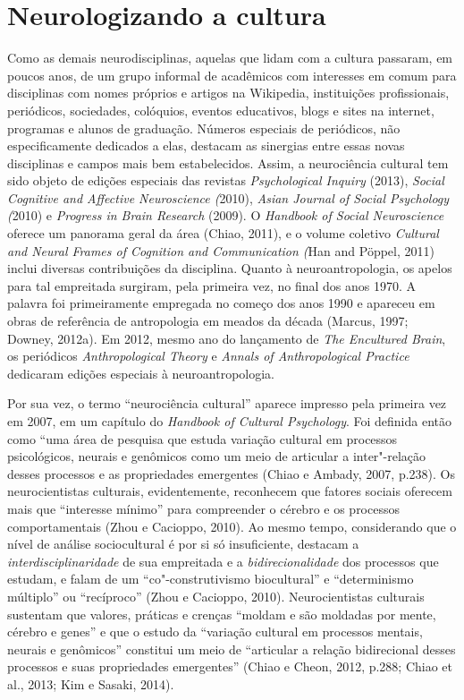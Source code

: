 \chapter{Neurologizando a cultura}

Como as demais neurodisciplinas, aquelas que lidam com a cultura
passaram, em poucos anos, de um grupo informal de acadêmicos com
interesses em comum para disciplinas com nomes próprios e artigos na
Wikipedia, instituições profissionais, periódicos, sociedades,
colóquios, eventos educativos, blogs e sites na internet, programas e
alunos de graduação. Números especiais de periódicos, não
especificamente dedicados a elas, destacam as sinergias entre essas
novas disciplinas e campos mais bem estabelecidos. Assim, a neurociência
cultural tem sido objeto de edições especiais das revistas
\emph{Psychological Inquiry} (2013), \emph{Social Cognitive and
Affective Neuroscience (}2010), \emph{Asian Journal of Social Psychology
(}2010) e \emph{Progress in Brain Research} (2009). O \emph{Handbook of
Social Neuroscience} oferece um panorama geral da área (Chiao, 2011), e
o volume coletivo \emph{Cultural and Neural Frames of Cognition and
Communication (}Han and Pöppel, 2011) inclui diversas contribuições da
disciplina. Quanto à neuroantropologia, os apelos para tal empreitada
surgiram, pela primeira vez, no final dos anos 1970. A palavra foi
primeiramente empregada no começo dos anos 1990 e apareceu em obras de
referência de antropologia em meados da década (Marcus, 1997; Downey,
2012a). Em 2012, mesmo ano do lançamento de \emph{The Encultured Brain},
os periódicos \emph{Anthropological Theory} e \emph{Annals of
Anthropological Practice} dedicaram edições especiais à
neuroantropologia.

Por sua vez, o termo ``neurociência cultural'' aparece impresso pela
primeira vez em 2007, em um capítulo do \emph{Handbook of Cultural
Psychology}. Foi definida então como ``uma área de pesquisa que estuda
variação cultural em processos psicológicos, neurais e genômicos como um
meio de articular a inter"-relação desses processos e as propriedades
emergentes (Chiao e Ambady, 2007, p.238). Os neurocientistas culturais,
evidentemente, reconhecem que fatores sociais oferecem mais que
``interesse mínimo'' para compreender o cérebro e os processos
comportamentais (Zhou e Cacioppo, 2010). Ao mesmo tempo, considerando
que o nível de análise sociocultural é por si só insuficiente, destacam
a \emph{interdisciplinaridade} de sua empreitada e a
\emph{bidirecionalidade} dos processos que estudam, e falam de um
``co"-construtivismo biocultural'' e ``determinismo múltiplo'' ou
``recíproco'' (Zhou e Cacioppo, 2010). Neurocientistas culturais
sustentam que valores, práticas e crenças ``moldam e são moldadas por
mente, cérebro e genes'' e que o estudo da ``variação cultural em
processos mentais, neurais e genômicos'' constitui um meio de
``articular a relação bidirecional desses processos e suas propriedades
emergentes'' (Chiao e Cheon, 2012, p.288; Chiao et al., 2013; Kim e
Sasaki, 2014).

